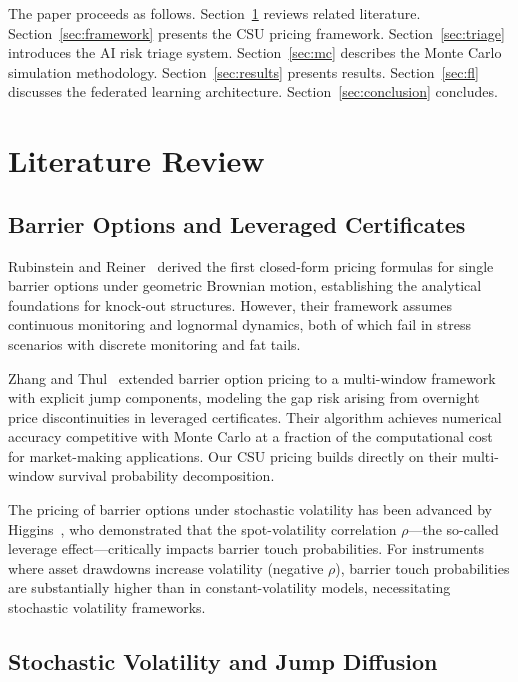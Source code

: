 \documentclass[12pt]{article}
\begin{document}
The paper proceeds as follows. Section~\ref{sec:lit} reviews related literature. Section~\ref{sec:framework}
presents the CSU pricing framework. Section~\ref{sec:triage} introduces the AI risk triage
system. Section~\ref{sec:mc} describes the Monte Carlo simulation methodology. Section~\ref{sec:results}
presents results. Section~\ref{sec:fl} discusses the federated learning architecture.
Section~\ref{sec:conclusion} concludes.

\section{Literature Review}\label{sec:lit}

\subsection{Barrier Options and Leveraged Certificates}

Rubinstein and Reiner~\cite{rubinstein1991unscrambling} derived the first closed-form pricing
formulas for single barrier options under geometric Brownian motion, establishing the analytical
foundations for knock-out structures. However, their framework assumes continuous monitoring and
lognormal dynamics, both of which fail in stress scenarios with discrete monitoring and fat tails.

Zhang and Thul~\cite{zhang2017gap} extended barrier option pricing to a multi-window framework
with explicit jump components, modeling the gap risk arising from overnight price discontinuities
in leveraged certificates. Their algorithm achieves numerical accuracy competitive with Monte Carlo
at a fraction of the computational cost for market-making applications. Our CSU pricing builds
directly on their multi-window survival probability decomposition.

The pricing of barrier options under stochastic volatility has been advanced by
Higgins~\cite{higgins2014stochastic}, who demonstrated that the spot-volatility correlation
$\rho$---the so-called leverage effect---critically impacts barrier touch probabilities. For
instruments where asset drawdowns increase volatility (negative $\rho$), barrier touch
probabilities are substantially higher than in constant-volatility models, necessitating
stochastic volatility frameworks.

\subsection{Stochastic Volatility and Jump Diffusion}
\end{document}
